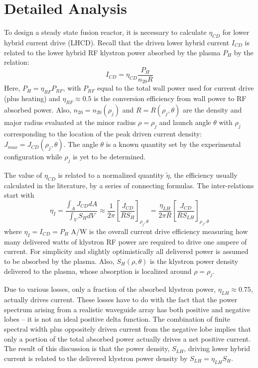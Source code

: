 \section{Detailed Analysis}

To design a steady state fusion reactor, it is necessary to calculate $\eta_{CD}$ for lower hybrid current drive (LHCD). Recall that the driven lower hybrid current $I_{CD}$ is related to the lower hybrid RF klystron power absorbed by the plasma $P_H$ by the relation:
\begin{equation}
\label{eq:lhcd_1}
I _ { C D } = \eta _ { C D } \frac { P _ { H } } { n _ { 20 } R }
\end{equation}
Here, $P_H = \eta_{RF} P_{RF}$, with $P_{RF}$ equal to the total wall power used for current drive (plus heating) and $\eta_{RF} \approx 0.5$ is the conversion efficiency from wall power to RF absorbed power. Also, $n_{20} = n_{20}(\rho_j)$ and $R = R(\rho_j, \theta)$ are the density and major radius evaluated at the minor radius $\rho = \rho_j$ and launch angle $\theta$ with $\rho_j$ corresponding to the location of the peak driven current density: $J_{max} = J_{CD}(\rho_j, \theta)$. The angle $\theta$ is a known quantity set by the experimental configuration while $\rho_j$ is yet to be determined.

The value of $\eta_{CD}$ is related to a normalized quantity $\tilde \eta$, the efficiency usually calculated in the literature, by a series of connecting formulas. The inter-relations start with 
\begin{equation}
 \eta_I = \frac { \int _ { A } J _ { C D } d A } { \int _ { V } S _ { H } d V } \approx \frac { 1 } { 2 \pi } \left[ \frac { J _ { C D } } { R S _ { H } } \right] _ { \rho _ { j } , \theta } = \frac { \eta _ { L H } } { 2 \pi R } \left[ \frac { J _ { C D } } { R S _ { L H } } \right] _ { \rho _ { J } , \theta }	
\end{equation}
where $\eta_I = I_{CD} = P_H$ A/W is the overall current drive efficiency measuring how many delivered watts of klystron RF power are required to drive one ampere of current. For simplicity and slightly optimistically all delivered power is assumed to be absorbed by the plasma. Also, $S_H(\rho,\theta)$ is the klystron power density delivered to the plasma, whose absorption is localized around $\rho = \rho_j$.

Due to various losses, only a fraction of the absorbed klystron power, $\eta_{LH} \approx 0.75$, actually drives current. These losses have to do with the fact that the power spectrum arising from a realistic waveguide array has both positive and negative lobes -- it is not an ideal positive delta function. The combination of finite spectral width plus oppositely driven current from the negative lobe implies that only a portion of the total absorbed power actually drives a net positive current. The result of this discussion is that the power density, $S_{LH}$, driving lower hybrid current is related to the delivered klystron power density by $S_{LH} = \eta_{LH} S_H$.

